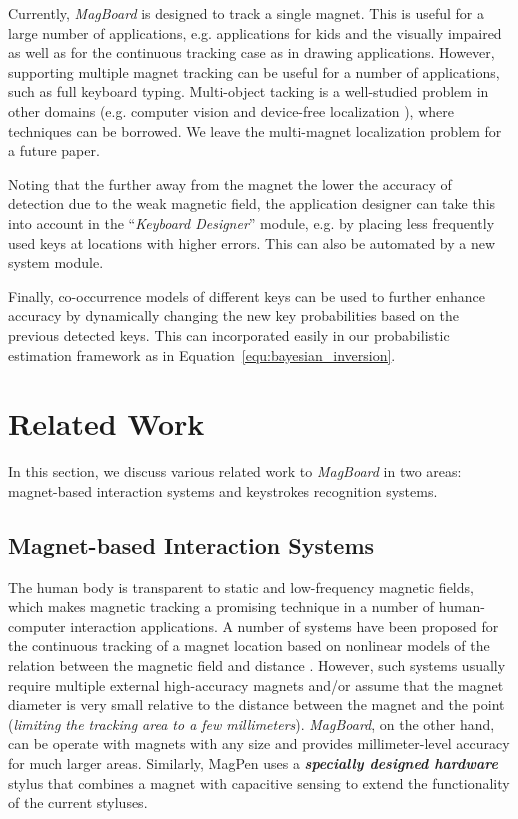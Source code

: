\documentclass[conference]{IEEEtran}
\def \sys {\textit{MagBoard}}
\begin{document}
Currently, \sys{} is designed to track a single magnet. This is useful for a large number of applications, e.g. applications for kids and the visually impaired as well as for the continuous tracking case as in drawing applications. However, supporting multiple magnet tracking can be useful for a number of applications, such as full keyboard typing. Multi-object tacking is a well-studied problem in other domains (e.g. computer vision \cite{krumm2000multi} and device-free localization \cite{sabek2012multi}), where techniques can be borrowed. We leave the multi-magnet localization problem for a future paper.  

Noting that the further away from the magnet the lower the accuracy of detection due to the weak magnetic field, the application designer can take this into account in the ``\emph{Keyboard Designer}'' module, e.g. by placing less frequently used keys at locations with higher errors. This can also be automated by a new system module.

Finally, co-occurrence models of different keys can be used to further enhance accuracy by dynamically changing the new key probabilities based on the previous detected keys. This can incorporated easily in our probabilistic estimation framework as  in Equation~\ref{equ:bayesian_inversion}.

\section{Related Work}
\label{related_work}
In this section, we discuss various related work to \sys{} in two areas: magnet-based interaction systems and keystrokes recognition systems.

\subsection{Magnet-based Interaction Systems}
The human body is transparent to static and low-frequency magnetic fields, which makes magnetic tracking a promising technique in a number of human-computer interaction applications. A number of systems have been proposed for the continuous tracking of a magnet location based on nonlinear models of the relation between the magnetic field and distance \cite{hu2005efficient,han2007wearable}. 
However, such systems usually require multiple external high-accuracy magnets and/or assume that the magnet diameter is very small relative to the distance between the magnet and the point (\emph{limiting the tracking area to a few millimeters}). \sys{}, on the other hand, can be operate with magnets with any size and provides millimeter-level accuracy for much larger areas. Similarly, MagPen \cite{hwang2013magpen} uses a \textbf{\emph{specially designed hardware}} stylus that combines a magnet with capacitive sensing to extend the functionality of the current styluses.
\end{document}
